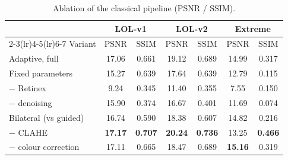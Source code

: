 \begin{table}[t]
\centering
\caption{Ablation of the classical pipeline (PSNR / SSIM).}
\label{tab:classical}
\setlength{\tabcolsep}{2.5pt}
\footnotesize
\begin{tabular}{l cc cc cc}
\toprule
 & \multicolumn{2}{c}{LOL-v1} & \multicolumn{2}{c}{LOL-v2} & \multicolumn{2}{c}{Extreme} \\
\cmidrule(lr){2-3}\cmidrule(lr){4-5}\cmidrule(lr){6-7}
Variant & PSNR & SSIM & PSNR & SSIM & PSNR & SSIM \\
\midrule
Adaptive, full & 17.06 & 0.661 & 19.12 & 0.689 & 14.99 & 0.317 \\
Fixed parameters & 15.27 & 0.639 & 17.64 & 0.639 & 12.79 & 0.115 \\
$-$ Retinex & 9.24 & 0.345 & 11.40 & 0.355 & 7.55 & 0.150 \\
$-$ denoising & 15.90 & 0.374 & 16.67 & 0.401 & 11.69 & 0.074 \\
Bilateral (vs guided) & 16.74 & 0.590 & 18.38 & 0.607 & 14.82 & 0.216 \\
$-$ CLAHE & \textbf{17.17} & \textbf{0.707} & \textbf{20.24} & \textbf{0.736} & 13.25 & \textbf{0.466} \\
$-$ colour correction & 17.11 & 0.665 & 18.47 & 0.689 & \textbf{15.16} & 0.319 \\
\bottomrule
\end{tabular}
\end{table}
